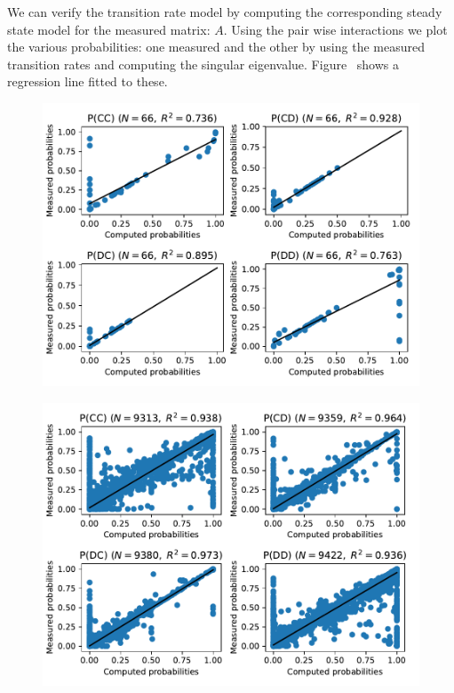\documentclass[a4paper]{article}
\begin{document}
We can verify the transition rate model by computing the corresponding steady
state model for the measured matrix: \(A\). 
Using the pair wise interactions we plot the various probabilities: one measured
and the other by using the measured transition rates and computing the singular
eigenvalue.
Figure~\cite{computed_probabilities_vs_theoretic_probabilities_in_stewart_plotkin} shows a
regression line fitted to these.

\begin{figure}[!htbp]
    \centering
    \includegraphics[width=.8\textwidth]{./assets/img/computed_probabilities_vs_theoretic_probabilities_in_stewart_plotkin/main.pdf}
\end{figure}


\begin{figure}[!htbp]
    \centering
    \includegraphics[width=.8\textwidth]{./assets/img/computed_probabilities_vs_theoretic_probabilities_in_full/main.pdf}
\end{figure}
\end{document}
